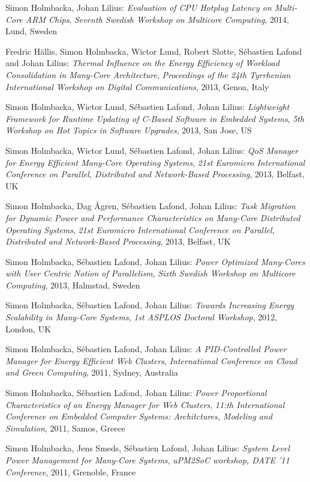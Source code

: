 \documentclass[margin,line]{resume}
\begin{document}
\begin{resume}
Simon Holmbacka, Johan Lilius: 
\textit{Evaluation of CPU Hotplug Latency on Multi-Core ARM Chips},
\textsl{Seventh Swedish Workshop on Multicore Computing}, 2014, Lund, Sweden 

Fredric H\"{a}llis, Simon Holmbacka, Wictor Lund, Robert Slotte, S\'{e}bastien Lafond and Johan Lilius:
\textit{Thermal Influence on the Energy Efficiency of Workload Consolidation in Many-Core Architecture}, 
\textsl{Proceedings of the 24th Tyrrhenian International Workshop on Digital Communications}, 2013, Genoa, Italy 

Simon Holmbacka, Wictor Lund, S\'{e}bastien Lafond, Johan Lilius: 
\textit{Lightweight Framework for Runtime Updating of C-Based Software in Embedded Systems},
\textsl{5th Workshop on Hot Topics in Software Upgrades}, 2013, San Jose, US

Simon Holmbacka, Wictor Lund, S\'{e}bastien Lafond, Johan Lilius: 
\textit{QoS Manager for Energy Efficient Many-Core Operating Systems},
\textsl{21st Euromicro International Conference on Parallel, Distributed and Network-Based Processing}, 2013, Belfast, UK

Simon Holmbacka, Dag \AA{}gren, S\'{e}bastien Lafond, Johan Lilius: 
\textit{Task Migration for Dynamic Power and Performance Characteristics on Many-Core Distributed Operating Systems},
\textsl{21st Euromicro International Conference on Parallel, Distributed and Network-Based Processing}, 2013, Belfast, UK

Simon Holmbacka, S\'{e}bastien Lafond, Johan Lilius: 
\textit{Power Optimized Many-Cores with User Centric Notion of Parallelism},
\textsl{Sixth Swedish Workshop on Multicore Computing}, 2013, Halmstad, Sweden
  
Simon Holmbacka, S\'{e}bastien Lafond, Johan Lilius: 
\textit{Towards Increasing Energy Scalability in Many-Core Systems}, 
\textsl{1st ASPLOS Doctoral Workshop}, 2012, London, UK

Simon Holmbacka, S\'{e}bastien Lafond, Johan Lilius: 
\textit{A PID-Controlled Power Manager for Energy Efficient Web Clusters}, 
\textsl{International Conference on Cloud and Green Computing}, 2011, Sydney, Australia 

Simon Holmbacka, S\'{e}bastien Lafond, Johan Lilius: 
\textit{Power Proportional Characteristics of an Energy Manager for Web Clusters}, 
\textsl{11:th International Conference on Embedded Computer Systems: Architctures, Modeling and Simulation}, 2011, Samos, Greece

Simon Holmbacka, Jens Smeds, S\'{e}bastien Lafond, Johan Lilius:
\textit{System Level Power Management for Many-Core Systems},
\textsl{uPM2SoC workshop, DATE '11 Conference}, 2011, Grenoble, France


\end{resume}
\end{document}
